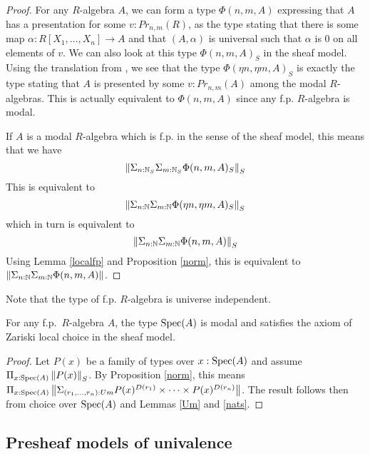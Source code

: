     \begin{proof}
          For any $R$-algebra $A$, we can form a type $\Phi(n,m,A)$ expressing that $A$ has a presentation for some $v:Pr_{n,m}(R)$,
    as the type stating that there is some map $\alpha:R[X_1,\dots,X_n]\rightarrow A$ and that $(A,\alpha)$ is universal such that
    $\alpha$ is $0$ on all elements of $v$. We can also look at this type $\Phi(n,m,A)_S$ in the sheaf model. Using the translation
    from \cite{Quirin16,CRS21}, we see that the type $\Phi(\eta n,\eta m,A)_S$ is exactly the type stating that $A$ is presented by
    some $v:Pr_{n,m}(A)$ among the modal $R$-algebras. This is actually equivalent to $\Phi(n,m,A)$ since any f.p. $R$-algebra is modal.

     If $A$ is a modal $R$-algebra which is f.p. in the sense of the sheaf model, this means that we have
     $$\left\lVert \Sigma_{n:\mathbb{N}_S}\Sigma_{m:\mathbb{N}_S}\Phi(n,m,A)_S \right\rVert_S$$
     This is equivalent to
     $$\left\lVert \Sigma_{n:\mathbb{N}}\Sigma_{m:\mathbb{N}}\Phi(\eta n,\eta m,A)_S \right\rVert_S$$
     which in turn is equivalent to
     $$\left\lVert \Sigma_{n:\mathbb{N}}\Sigma_{m:\mathbb{N}}\Phi(n,m,A) \right\rVert_S$$
     Using Lemma \ref{localfp} and Proposition \ref{norm}, this is equivalent to $\left\lVert \Sigma_{n:\mathbb{N}}\Sigma_{m:\mathbb{N}}\Phi(n,m,A) \right\rVert$.
    \end{proof}

     Note that the type of f.p. $R$-algebra is universe independent.

    \begin{proposition}
      For any f.p.\ $R$-algebra $A$, the type $\operatorname{Spec}(A)$ is modal and satisfies the axiom of Zariski local choice in
      the sheaf model.
    \end{proposition}
    
    \begin{proof}
      Let $P(x)$ be a family of types over $x:\operatorname{Spec}(A)$ and assume $\Pi_{x:\operatorname{Spec}(A)}\left\lVert P(x) \right\rVert_S$. By Proposition \ref{norm},
      this means $\Pi_{x:\operatorname{Spec}(A)}\left\lVert \Sigma_{(r_1,\dots,r_n):Um}P(x)^{D(r_1)}\times\dots\times P(x)^{D(r_n)} \right\rVert$. The result follows
      then from choice over $\operatorname{Spec}(A)$ and Lemmas \ref{Um} and \ref{nats}.
    \end{proof}      


    \subsection{Presheaf models of univalence}

